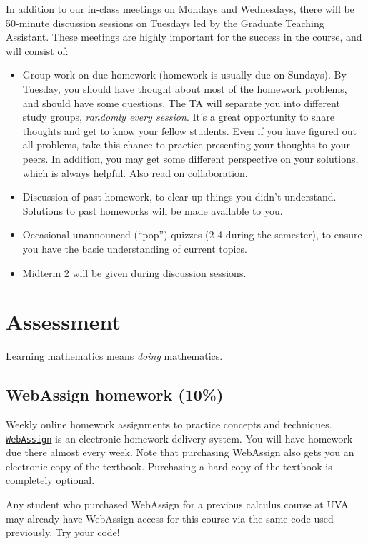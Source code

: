 \documentclass[oneside,11pt]{amsart}
\begin{document}
In addition to our in-class meetings on Mondays and Wednesdays, there will be 50-minute discussion sessions on Tuesdays led by the Graduate Teaching Assistant. These meetings are highly important for the success in the course, and will consist of:
\begin{itemize}
	\item 
		Group work on due homework (homework is usually due on Sundays). By Tuesday, you should have thought about most of the homework problems, and should have some questions. The TA will separate you into different study groups, \emph{randomly every session}. It's a great opportunity to share thoughts and get to know your fellow students. Even if you have figured out all problems, take this chance to practice presenting your thoughts to your peers. In addition, you may get some different perspective on your solutions, which is always helpful. Also read  on collaboration.
	\item 
	Discussion of past homework, to clear up things you didn't understand. Solutions to past homeworks will be made available to you.
	\item Occasional unannounced (``pop'') quizzes (2-4 during the semester), to ensure you have the basic understanding of current topics.
	\item Midterm 2 will be given during discussion sessions.
\end{itemize}

\section{Assessment}

Learning mathematics means \emph{doing} mathematics. 

\subsection{WebAssign homework (10\%)} Weekly online homework assignments to practice concepts and techniques.
\href{https://www.webassign.net/}{\textcolor{green!70!black}{\texttt{WebAssign}}} is an electronic homework delivery system. You will have homework due there almost every week. Note that purchasing WebAssign also gets you an electronic copy of the textbook. Purchasing a hard copy of the textbook is completely optional.

Any student who purchased WebAssign for a previous calculus course at UVA may already have WebAssign access for this course via the same code used previously. Try your code!
\end{document}
